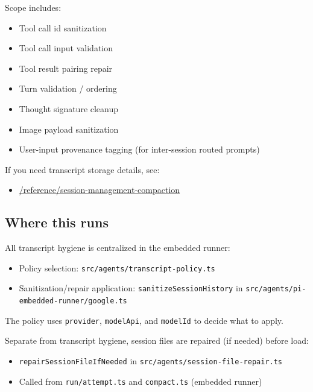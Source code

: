 Scope includes:

\begin{itemize}
  \item Tool call id sanitization
  \item Tool call input validation
  \item Tool result pairing repair
  \item Turn validation / ordering
  \item Thought signature cleanup
  \item Image payload sanitization
  \item User-input provenance tagging (for inter-session routed prompts)
\end{itemize}


If you need transcript storage details, see:

\begin{itemize}
  \item \href{/reference/session-management-compaction}{/reference/session-management-compaction}
\end{itemize}


\hrulefill


\subsection{Where this runs}


All transcript hygiene is centralized in the embedded runner:

\begin{itemize}
  \item Policy selection: \texttt{src/agents/transcript-policy.ts}
  \item Sanitization/repair application: \texttt{sanitizeSessionHistory} in \texttt{src/agents/pi-embedded-runner/google.ts}
\end{itemize}


The policy uses \texttt{provider}, \texttt{modelApi}, and \texttt{modelId} to decide what to apply.

Separate from transcript hygiene, session files are repaired (if needed) before load:

\begin{itemize}
  \item \texttt{repairSessionFileIfNeeded} in \texttt{src/agents/session-file-repair.ts}
  \item Called from \texttt{run/attempt.ts} and \texttt{compact.ts} (embedded runner)
\end{itemize}


